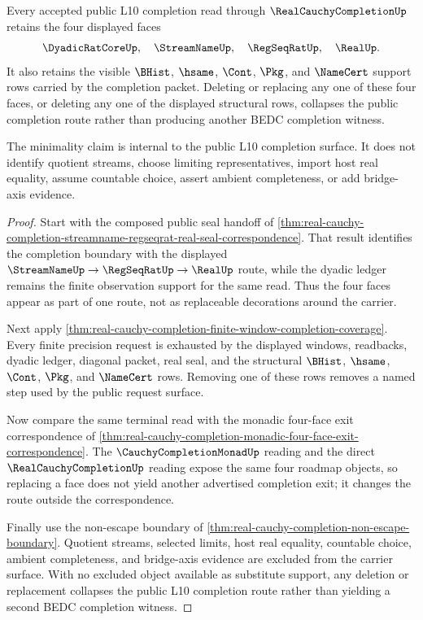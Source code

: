 \begin{theorem}
\label{thm:real-cauchy-completion-terminal-support-minimality}
Every accepted public L10 completion read through $\RealCauchyCompletionUp$ retains the four displayed faces
$$
\DyadicRatCoreUp,\quad \StreamNameUp,\quad \RegSeqRatUp,\quad \RealUp .
$$
It also retains the visible $\BHist$, $\hsame$, $\Cont$, $\Pkg$, and $\NameCert$ support rows carried by the completion packet. Deleting or replacing any one of these four faces, or deleting any one of the displayed structural rows, collapses the public completion route rather than producing another BEDC completion witness.

The minimality claim is internal to the public L10 completion surface. It does not identify quotient streams, choose limiting representatives, import host real equality, assume countable choice, assert ambient completeness, or add bridge-axis evidence.
\end{theorem}
\begin{proof}
Start with the composed public seal handoff of \autoref{thm:real-cauchy-completion-streamname-regseqrat-real-seal-correspondence}. That result identifies the completion boundary with the displayed $\StreamNameUp \to \RegSeqRatUp \to \RealUp$ route, while the dyadic ledger remains the finite observation support for the same read. Thus the four faces appear as part of one route, not as replaceable decorations around the carrier.

Next apply \autoref{thm:real-cauchy-completion-finite-window-completion-coverage}. Every finite precision request is exhausted by the displayed windows, readbacks, dyadic ledger, diagonal packet, real seal, and the structural $\BHist$, $\hsame$, $\Cont$, $\Pkg$, and $\NameCert$ rows. Removing one of these rows removes a named step used by the public request surface.

Now compare the same terminal read with the monadic four-face exit correspondence of \autoref{thm:real-cauchy-completion-monadic-four-face-exit-correspondence}. The $\CauchyCompletionMonadUp$ reading and the direct $\RealCauchyCompletionUp$ reading expose the same four roadmap objects, so replacing a face does not yield another advertised completion exit; it changes the route outside the correspondence.

Finally use the non-escape boundary of \autoref{thm:real-cauchy-completion-non-escape-boundary}. Quotient streams, selected limits, host real equality, countable choice, ambient completeness, and bridge-axis evidence are excluded from the carrier surface. With no excluded object available as substitute support, any deletion or replacement collapses the public L10 completion route rather than yielding a second BEDC completion witness.
\end{proof}

